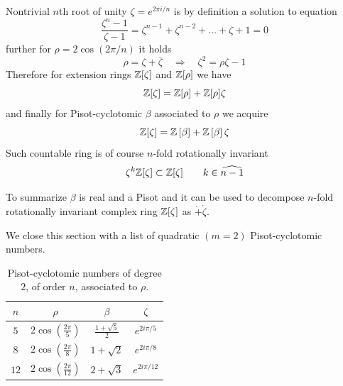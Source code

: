 \documentclass[text.tex]{subfiles}
\begin{document}
Nontrivial $n$th root of unity $\zeta = e^{2\pi i/n}$ is by definition a solution to equation
$$\frac{\zeta^n-1}{\zeta-1} = \zeta^{n-1}+\zeta^{n-2}+\dots+\zeta+1 = 0$$
further for $\rho = 2\cos\left(2\pi/n\right)$ it holds
$$\rho = \zeta + \bar{\zeta}\quad\Rightarrow\quad \zeta^2 = \rho\zeta - 1$$
Therefore for extension rings $\mathbb{Z}[\zeta]$ and $\mathbb{Z}[\rho]$ we have
$$\mathbb{Z}[\zeta] = \mathbb{Z}[\rho] + \mathbb{Z}[\rho]\zeta$$
and finally for Pisot-cyclotomic $\beta$ associated to $\rho$ we acquire
$$\mathbb{Z}[\zeta] = \mathbb{Z}\left[\beta\right] + \mathbb{Z}\left[\beta\right]\zeta$$
Such countable ring is of course $n$-fold rotationally invariant
$$\zeta^k\mathbb{Z}[\zeta] \subset \mathbb{Z}[\zeta]\qquad k\in\widehat{n-1}$$

To summarize $\beta$ is real and a Pisot and it can be used to decompose $n$-fold rotationally invariant complex ring $\mathbb{Z}[\zeta]$ as $\ring + \ring\zeta$. 




We close this section with a list of quadratic $(m=2)$ Pisot-cyclotomic numbers. 

\begin{table}[h!]
\centering
\begin{tabular}{cccc}
$n$ & $\rho$ & $\beta$ & $\zeta$ \\
\hline
$5$   & $2 \cos\left(\frac{2\pi}{5}\right)$   & $\frac{1+\sqrt{5}}{2} $   & $e^{2i\pi/5}$ \\
$8$   & $2 \cos\left(\frac{2\pi}{8}\right)$   & $ 1+\sqrt{2} $            & $e^{2i\pi/8}$ \\
$12$  & $2 \cos\left(\frac{2\pi}{12}\right)$  & $ 2+\sqrt{3} $            & $e^{2i\pi/12}$ \\
\end{tabular}
\caption{Pisot-cyclotomic numbers of degree $2$, of order $n$, associated to $\rho$.}
\label{tab_quadraticPisotCyclotomic}
\end{table}
\end{document}
